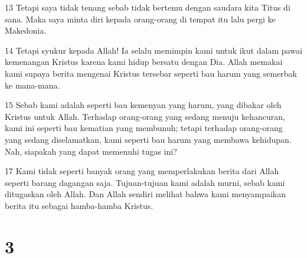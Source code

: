\par 13 Tetapi saya tidak tenang sebab tidak bertemu dengan saudara kita Titus di sana. Maka saya minta diri kepada orang-orang di tempat itu lalu pergi ke Makedonia.
\par 14 Tetapi syukur kepada Allah! Ia selalu memimpin kami untuk ikut dalam pawai kemenangan Kristus karena kami hidup bersatu dengan Dia. Allah memakai kami supaya berita mengenai Kristus tersebar seperti bau harum yang semerbak ke mana-mana.
\par 15 Sebab kami adalah seperti bau kemenyan yang harum, yang dibakar oleh Kristus untuk Allah. Terhadap orang-orang yang sedang menuju kehancuran, kami ini seperti bau kematian yang membunuh; tetapi terhadap orang-orang yang sedang diselamatkan, kami seperti bau harum yang membawa kehidupan. Nah, siapakah yang dapat memenuhi tugas ini?
\par 17 Kami tidak seperti banyak orang yang memperlakukan berita dari Allah seperti barang dagangan saja. Tujuan-tujuan kami adalah murni, sebab kami ditugaskan oleh Allah. Dan Allah sendiri melihat bahwa kami menyampaikan berita itu sebagai hamba-hamba Kristus.

\chapter{3}

